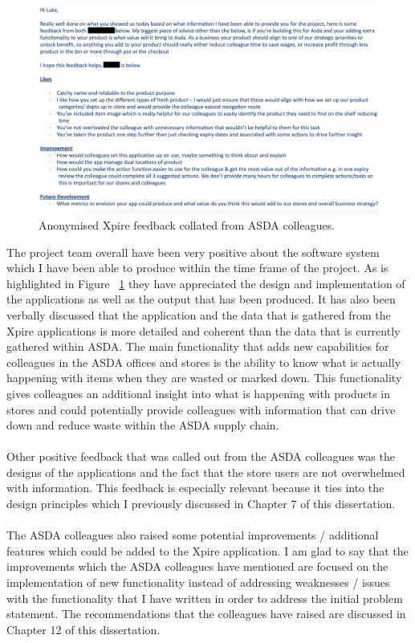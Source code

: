 \documentclass[a4paper,11pt]{report}
\begin{document}
\begin{figure}[H]
    \centering
    \includegraphics[width=15cm]{./assets/images/feedback.png}
    \caption{Anonymised Xpire feedback collated from ASDA colleagues.}
    \label{fig:feedback}
\end{figure}
The project team overall have been very positive about the software system which I have been able to produce within the time frame of the project. 
As is highlighted in Figure ~\ref{fig:feedback} they have appreciated the design and implementation of the applications as well as the output that has been produced.
It has also been verbally discussed that the application and the data that is gathered from the Xpire applications is more detailed and coherent than the 
data that is currently gathered within ASDA. The main functionality that adds new capabilities for colleagues in the ASDA offices and stores is the ability
to know what is actually happening with items when they are wasted or marked down. 
This functionality gives colleagues an additional insight into what is happening with products in stores and could potentially provide colleagues with information that can drive down and reduce waste within the ASDA supply chain. 
\\
\\
Other positive feedback that was called out from the ASDA colleagues was the designs of the applications and the fact that the store users are not overwhelmed with information. 
This feedback is especially relevant because it ties into the design principles which I previously discussed in Chapter 7 of this dissertation. 
\\
\\
The ASDA colleagues also raised some potential improvements / additional features which could be added to the Xpire application. I am glad to say that the improvements which the ASDA colleagues have mentioned are focused on the implementation of new functionality instead of addressing weaknesses / issues with the functionality that I have written in order to address the initial problem statement. The recommendations that the colleagues have raised are discussed in Chapter 12 of this dissertation.
\end{document}
